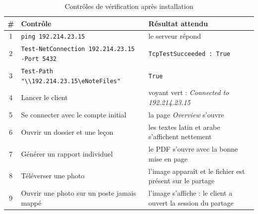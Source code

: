 \begin{table}[H]
\centering
\caption{Contrôles de vérification après installation}
\label{tab:verification}
\begin{tabularx}{\textwidth}{c X X}
\toprule
\textbf{\#} & \textbf{Contrôle} & \textbf{Résultat attendu} \\
\midrule
1 & \texttt{ping 192.214.23.15} & le serveur répond \\
2 & \texttt{Test-NetConnection 192.214.23.15 -Port 5432} & \texttt{TcpTestSucceeded : True} \\
3 & \texttt{Test-Path "}\texttt{\textbackslash\textbackslash 192.214.23.15\textbackslash eNoteFiles"} & \texttt{True} \\
4 & Lancer le client & voyant vert : \emph{Connected to 192.214.23.15} \\
5 & Se connecter avec le compte initial & la page \emph{Overview} s'ouvre \\
6 & Ouvrir un dossier et une leçon & les textes latin et arabe s'affichent nettement \\
7 & Générer un rapport individuel & le \ac{PDF} s'ouvre avec la bonne mise en page \\
8 & Téléverser une photo & l'image apparaît et le fichier est présent sur le partage \\
9 & Ouvrir une photo sur un poste jamais mappé & l'image s'affiche : le client a ouvert la session du partage \\
\bottomrule
\end{tabularx}
\end{table}

